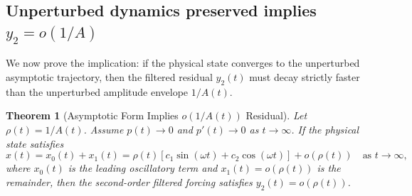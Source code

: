\documentclass[10pt,reqno]{amsart}
\newtheorem{theorem}{Theorem}
\theoremstyle{definition}
\begin{document}
		\subsection{Unperturbed dynamics preserved implies $y_2=o(1/A)$} 
	
	We now prove the implication: if the physical state converges to the unperturbed asymptotic trajectory, then the filtered residual $y_2(t)$ must decay strictly faster than the unperturbed amplitude envelope $1/A(t)$. 
	
	\begin{theorem}[Asymptotic Form Implies $o(1/A(t))$ Residual] \label{thm:asymp_implies_y2}
		Let $\rho(t) = 1/A(t)$. Assume $p(t) \to 0$ and $p'(t) \to 0$ as $t \to \infty$. 
		If the physical state satisfies
		\[ x(t) = x_0(t) + x_1(t) = \rho(t)\left[c_1 \sin(\omega t) + c_2 \cos(\omega t)\right] + o(\rho(t)) \quad \text{as } t \to \infty, \]
		where $x_0(t)$ is the leading oscillatory term and $x_1(t) = o(\rho(t))$ is the remainder, then the second-order filtered forcing satisfies $y_2(t) = o(\rho(t))$.
	\end{theorem}
	
\end{document}
